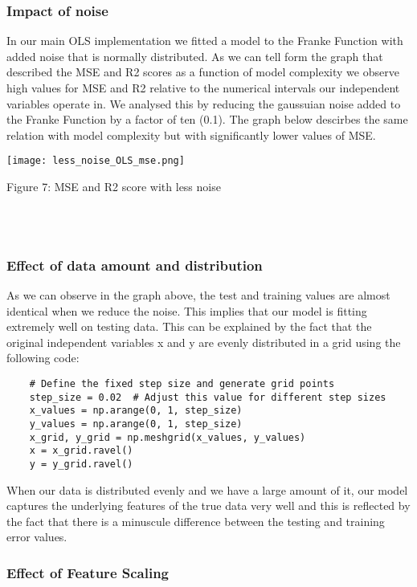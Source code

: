 \documentclass{article}
\begin{document}
\begin{enumerate}
\subsubsection{Impact of noise}
In our main OLS implementation we fitted a model to the Franke Function with added noise that is normally distributed. As we can tell form the graph that described the MSE and R2 scores as a function of model complexity we observe high values for MSE and R2 relative to the numerical intervals our independent variables operate in. We analysed this by reducing the gaussuian noise added to the Franke Function by a factor of ten (0.1). The graph below descirbes the same relation with model complexity but with significantly lower values of MSE.  


    \texttt{[image: less\_noise\_OLS\_mse.png]}
    \caption{Figure 7: MSE and R2 score with less noise}
    \label{fig:enter-label}\\\\

\subsubsection{Effect of data amount and distribution}

As we can observe in the graph above, the test and training values are almost identical when we reduce the noise. This implies that our model is fitting extremely well on testing data. This can be explained by the fact that the original independent variables x and y are evenly distributed in a grid using the following code: 

\begin{verbatim} 
    # Define the fixed step size and generate grid points
    step_size = 0.02  # Adjust this value for different step sizes
    x_values = np.arange(0, 1, step_size)
    y_values = np.arange(0, 1, step_size)
    x_grid, y_grid = np.meshgrid(x_values, y_values)
    x = x_grid.ravel()
    y = y_grid.ravel()
\end{verbatim}

When our data is distributed evenly and we have a large amount of it, our model captures the underlying features of the true data very well and this is reflected by the fact that there is a minuscule difference between the testing and training error values.

\subsubsection{Effect of Feature Scaling}


\end{enumerate}
\end{document}
